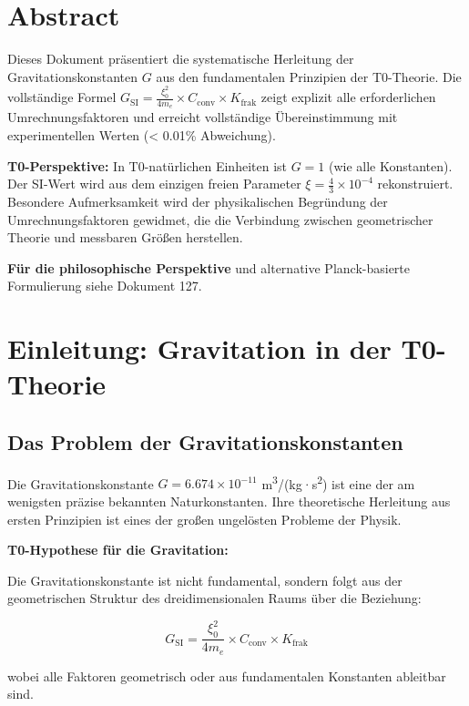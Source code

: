\section*{Abstract}
		Dieses Dokument präsentiert die systematische Herleitung der Gravitationskonstanten $G$ aus den fundamentalen Prinzipien der T0-Theorie. Die vollständige Formel $G_{\text{SI}} = \frac{\xi_0^2}{4 m_e} \times C_{\text{conv}} \times K_{\text{frak}}$ zeigt explizit alle erforderlichen Umrechnungsfaktoren und erreicht vollständige Übereinstimmung mit experimentellen Werten (< 0.01\% Abweichung). 
		
		\textbf{T0-Perspektive:} In T0-natürlichen Einheiten ist $G = 1$ (wie alle Konstanten). Der SI-Wert wird aus dem einzigen freien Parameter $\xi = \frac{4}{3} \times 10^{-4}$ rekonstruiert. Besondere Aufmerksamkeit wird der physikalischen Begründung der Umrechnungsfaktoren gewidmet, die die Verbindung zwischen geometrischer Theorie und messbaren Größen herstellen.
		
		\textbf{Für die philosophische Perspektive} und alternative Planck-basierte Formulierung siehe Dokument 127.

	
	
	\section{Einleitung: Gravitation in der T0-Theorie}
	
	\subsection{Das Problem der Gravitationskonstanten}
	
	Die Gravitationskonstante $G = 6.674 \times 10^{-11}$ m\textsuperscript{3}/(kg·s\textsuperscript{2}) ist eine der am wenigsten präzise bekannten Naturkonstanten. Ihre theoretische Herleitung aus ersten Prinzipien ist eines der großen ungelösten Probleme der Physik.
	
	\begin{keyresult}
		\textbf{T0-Hypothese für die Gravitation:}
		
		Die Gravitationskonstante ist nicht fundamental, sondern folgt aus der geometrischen Struktur des dreidimensionalen Raums über die Beziehung:
		
		\begin{equation}
			\boxed{G_{\text{SI}} = \frac{\xi_0^2}{4 m_e} \times C_{\text{conv}} \times K_{\text{frak}}}
			\label{eq:G_complete}
		\end{equation}
		
		wobei alle Faktoren geometrisch oder aus fundamentalen Konstanten ableitbar sind.
	\end{keyresult}
	
